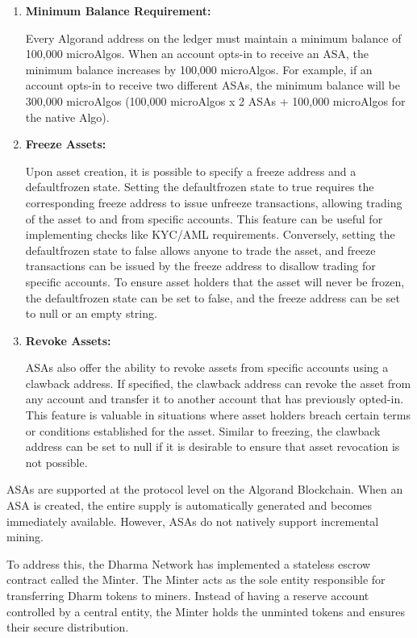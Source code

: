 \begin{enumerate}
    \item \textbf{Minimum Balance Requirement:}

    Every Algorand address on the ledger must maintain a minimum balance of 100,000 microAlgos. When an account opts-in to receive an ASA, the minimum balance increases by 100,000 microAlgos. For example, if an account opts-in to receive two different ASAs, the minimum balance will be 300,000 microAlgos (100,000 microAlgos x 2 ASAs + 100,000 microAlgos for the native Algo).


    \item \textbf{Freeze Assets:}

    Upon asset creation, it is possible to specify a freeze address and a defaultfrozen state. Setting the defaultfrozen state to true requires the corresponding freeze address to issue unfreeze transactions, allowing trading of the asset to and from specific accounts. This feature can be useful for implementing checks like KYC/AML requirements. Conversely, setting the defaultfrozen state to false allows anyone to trade the asset, and freeze transactions can be issued by the freeze address to disallow trading for specific accounts. To ensure asset holders that the asset will never be frozen, the defaultfrozen state can be set to false, and the freeze address can be set to null or an empty string.

    \item \textbf{Revoke Assets:}

    ASAs also offer the ability to revoke assets from specific accounts using a clawback address. If specified, the clawback address can revoke the asset from any account and transfer it to another account that has previously opted-in. This feature is valuable in situations where asset holders breach certain terms or conditions established for the asset. Similar to freezing, the clawback address can be set to null if it is desirable to ensure that asset revocation is not possible.

    
\end{enumerate}



ASAs are supported at the protocol level on the Algorand Blockchain. When an ASA is created, the entire supply is automatically generated and becomes immediately available. However, ASAs do not natively support incremental mining.\newline

To address this, the Dharma Network has implemented a stateless escrow contract called the Minter. The Minter acts as the sole entity responsible for transferring Dharm tokens to miners. Instead of having a reserve account controlled by a central entity, the Minter holds the unminted tokens and ensures their secure distribution.

